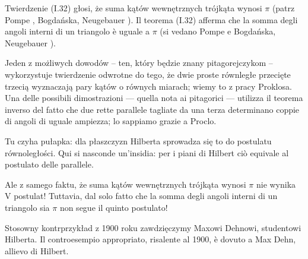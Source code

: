 Twierdzenie (I.32) głosi, że suma kątów wewnętrznych trójkąta wynosi $\pi$ (patrz Pompe \cite[s. 5]{pompe_2022}, Bogdańska, Neugebauer \cite[s. 7]{neugebauer_2018}). %
Il teorema (I.32) afferma che la somma degli angoli interni di un triangolo è uguale a $\pi$ (si vedano Pompe \cite[p.~5]{pompe_2022} e Bogdańska, Neugebauer \cite[p.~7]{neugebauer_2018}). %



Jeden z możliwych dowodów -- ten, który będzie znany pitagorejczykom -- wykorzystuje twierdzenie odwrotne do tego, że dwie proste równległe przecięte trzecią wyznaczają pary kątów o równych miarach; wiemy to z pracy Proklosa. %
Una delle possibili dimostrazioni --- quella nota ai pitagorici --- utilizza il teorema inverso del fatto che due rette parallele tagliate da una terza determinano coppie di angoli di uguale ampiezza; lo sappiamo grazie a Proclo. %


Tu czyha pułapka: dla płaszczyzn Hilberta sprowadza się to do postulatu równoległości. %
Qui si nasconde un'insidia: per i piani di Hilbert ciò equivale al postulato delle parallele. %

Ale z samego faktu, że suma kątów wewnętrznych trójkąta wynosi $\pi$ nie wynika V postulat! %
Tuttavia, dal solo fatto che la somma degli angoli interni di un triangolo sia $\pi$ non segue il quinto postulato! %


Stosowny kontrprzykład z 1900 roku zawdzięczymy Maxowi Dehnowi, studentowi Hilberta. %
Il controesempio appropriato, risalente al 1900, è dovuto a Max Dehn, allievo di Hilbert. %

%

